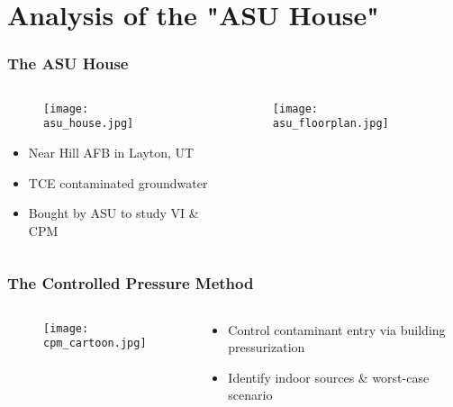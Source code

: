 \section{Analysis of the "ASU House"}

\begin{frame}
  \frametitle{The ASU House}
  \begin{columns}[T]
    \begin{column}{0.5\textwidth}
      \begin{figure}
        \centering
        \texttt{[image: asu\_house.jpg]}
        \caption{\tiny{\citeauthor{holton_temporal_2013}\cite{holton_temporal_2013}}}
      \end{figure}
      \begin{itemize}
        \item Near Hill AFB in Layton, UT
        \item TCE contaminated groundwater
        \item Bought by ASU to study VI \& CPM
      \end{itemize}
    \end{column}
    \begin{column}{0.5\textwidth}
      \begin{figure}
        \centering
        \texttt{[image: asu\_floorplan.jpg]}
        \caption{\tiny{\citeauthor{holton_temporal_2013}\cite{holton_temporal_2013}}}
      \end{figure}
    \end{column}
  \end{columns}
\end{frame}

\begin{frame}
  \frametitle{The Controlled Pressure Method}
  \begin{columns}[T]
    \begin{column}{0.6\textwidth}
      \begin{figure}
        \centering
        \texttt{[image: cpm\_cartoon.jpg]}
        \caption{\tiny{\citeauthor{holton_long-term_2015}\cite{holton_long-term_2015}}}
      \end{figure}
    \end{column}
    \begin{column}{0.4\textwidth}
      \begin{block}{ }
        \begin{itemize}
          \item Control contaminant entry via building pressurization
          \item Identify indoor sources \& worst-case scenario
        \end{itemize}
      \end{block}
    \end{column}
  \end{columns}

\end{frame}

